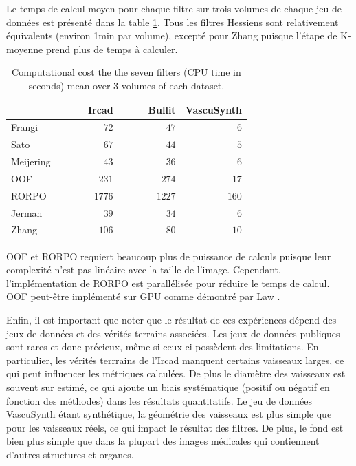 Le temps de calcul moyen pour chaque filtre sur trois volumes de chaque jeu de données est présenté dans la table \ref{tab:Computation time benchmark}. Tous les filtres Hessiens sont relativement équivalents (environ 1min par volume), excepté pour Zhang puisque l'étape de K-moyenne prend plus de temps à calculer.

\begin{table}
  \centering
  \caption{Computational cost the the seven filters (CPU time in seconds) mean over 3 volumes of each dataset.}
  \label{tab:Computation time benchmark}
  \begin{tabular}{lrrr}
  \hline
                     & Ircad      & Bullit  & VascuSynth \\
                     \hline
  Frangi    & ~~~~~~~~~$72$  & ~~~~~~~~~$47$   & ~~~~~~~~~$6$   \\
  Sato      & $67$  & $44$   & $5$   \\
  Meijering & $43$  & $36$   & $6$   \\
  OOF       & $231$  & $274$   & $17$   \\
  RORPO     & $1776$  & $1227$   & $160$   \\
  Jerman    & $39$  & $34$   & $6$   \\
  Zhang     & $106$  & $80$   & $10$  \\
  \hline
  \end{tabular}
  \end{table}

OOF et RORPO requiert beaucoup plus de puissance de calculs puisque leur complexité n'est pas linéaire avec la taille de l'image. Cependant, l'implémentation de RORPO est parallélisée pour réduire le temps de calcul. OOF peut-être implémenté sur GPU comme démontré par Law \cite{Law2009_efficient_implementation}.

Enfin, il est important que noter que le résultat de ces expériences dépend des jeux de données et des vérités terrains associées. Les jeux de données publiques sont rares et donc précieux, même si ceux-ci possèdent des limitations. En particulier, les vérités terrrains de l'Ircad manquent certains vaisseaux larges, ce qui peut influencer les métriques calculées. De plus le diamètre des vaisseaux est souvent sur estimé, ce qui ajoute un biais systématique (positif ou négatif en fonction des méthodes) dans les résultats quantitatifs. Le jeu de données VascuSynth étant synthétique, la géométrie des vaisseaux est plus simple que pour les vaisseaux réels, ce qui impact le résultat des filtres. De plus, le fond est bien plus simple que dans la plupart des images médicales qui contiennent d'autres structures et organes.



